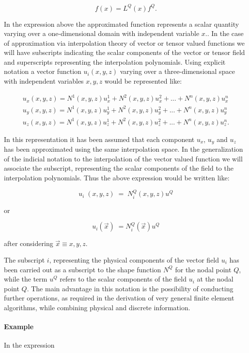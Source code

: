 \[f(x)=L^Q(x)f^Q.\]


In the expression above the approximated function represents a scalar quantity varying over a one-dimensional domain with independent variable $x.$. In the case of approximation via interpolation theory of vector or tensor valued functions we will have subscripts indicating the scalar components of the vector or tensor field and superscripts representing the interpolation polynomials. Using explicit notation a vector function $u_i (x,y,z)$ varying over a three-dimensional space with independent variables $x,y,z$ would be represented like:


\[
\begin{array}{l}u_x(x,y,z)=N^1(x,y,z)u_x^1+N^2(x,y,z)u_x^2+...+N^n(x,y,z)u_x^n\\u_y(x,y,z)=N^1(x,y,z)u_y^1+N^2(x,y,z)u_y^2+...+N^n(x,y,z)u_y^n\\u_z(x,y,z)=N^1(x,y,z)u_z^1+N^2(x,y,z)u_z^2+...+N^n(x,y,z)u_z^n.\end{array}
\]

In this representation it has been assumed that each component $u_x$, $u_y$ and $u_z$ has been approximated using the same interpolation space. In the generalization of the indicial notation to the interpolation of the vector valued function we will associate the subscript, representing the scalar components of the field to the interpolation polynomials. Thus the above expression would be written like:

\[u_i\;(x,y,z)\;=\;N_i^Q(x,y,z)u^Q\]

or 

\[u_i(\overrightarrow x)\;=N_i^Q(\overrightarrow x)u^Q\]

after considering $\overrightarrow x \equiv x,y,z.$


The subscript $i$, representing the physical components of the vector field $u_i$ has been carried out as a subscript to the shape function $N^Q$ for the nodal point $Q$, while the term $u^Q$ refers to the scalar components of the field $u_i$ at the nodal point $Q$. The main advantage in this notation is the possibility of conducting further operations, as required in the derivation of very general finite element algorithms, while combining physical and discrete information.

\paragraph*{Example}

In the expression

